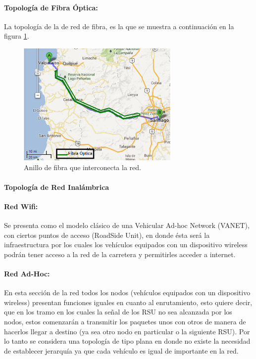 \documentclass[12pt]{article}
\begin{document}
\paragraph{Topología de Fibra Óptica:}
La topología de la de red de fibra, es la que se muestra a continuación en la figura \ref{fig:anillo_FO}.
\begin{figure}[H]
  \centering
      \includegraphics[width=0.7\textwidth]{anillo_FO}
	    \caption{Anillo de fibra que interconecta la red.}
	\label{fig:anillo_FO}
\end{figure}

\paragraph{Topología de Red Inalámbrica}
\paragraph{Red Wifi:} 
Se presenta como el modelo clásico de una Vehicular Ad-hoc Network (VANET), con ciertos puntos de acceso 
(RoadSide Unit), en donde ésta será la infraestructura por los cuales los vehículos equipados con un
dispositivo wireless podrán tener acceso a la red de la carretera y permitirles acceder a internet.

\paragraph{Red Ad-Hoc:}
En esta sección de la red todos los nodos (vehículos equipados con un dispositivo wireless) presentan 
funciones iguales en cuanto al enrutamiento, esto quiere decir, que en los tramo en los cuales la señal de 
los RSU no sea alcanzada por los nodos, estos comenzarán a transmitir los paquetes unos con otros de manera 
de hacerlos llegar a destino (ya sea otro nodo en particular o la siguiente RSU). Por lo tanto se considera 
una topología de tipo plana en donde no existe la necesidad de establecer jerarquía ya que cada vehículo es 
igual de importante en la red.
\end{document}
